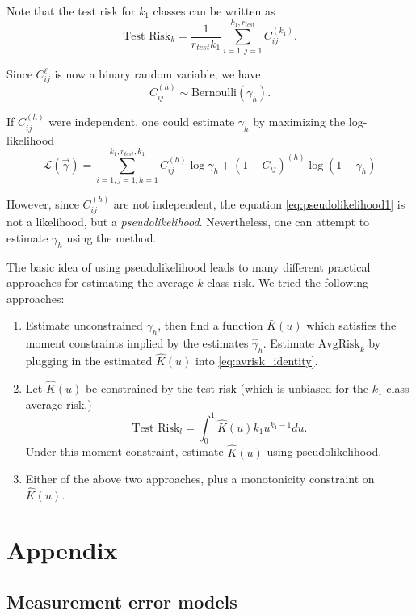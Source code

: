 \documentclass[12pt]{article}
\begin{document}
Note that the test risk for $k_1$ classes can be written as
\[
\text{Test Risk}_k = \frac{1}{r_{test}k_1}\sum_{i=1,j=1}^{k_1,r_{test}} C_{ij}^{(k_1)}.
\]

Since $C_{ij}^\ell$ is now a binary random variable, we have
\[
C_{ij}^{(h)} \sim \text{Bernoulli}(\gamma_h).
\]

If $C_{ij}^{(h)}$ were independent, one could estimate $\gamma_h$ by
maximizing the log-likelihood
\begin{equation}\label{eq:pseudolikelihood1}
\mathcal{L}(\vec{\gamma}) = \sum_{i=1,j=1,h=1}^{k_1, r_{test}, k_1} C_{ij}^{(h)} \log \gamma_h + (1-C_{ij})^{(h)} \log (1-\gamma_h)
\end{equation}

However, since $C_{ij}^{(h)}$ are not independent, the equation
\eqref{eq:pseudolikelihood1} is not a likelihood, but a
\emph{pseudolikelihood}.  Nevertheless, one can attempt to estimate
$\gamma_h$ using the method.

The basic idea of using pseudolikelihood leads to many different
practical approaches for estimating the average $k$-class risk.  We tried the following approaches:
\begin{enumerate}
\item Estimate unconstrained $\gamma_h$, then find a function
  $\bar{K}(u)$ which satisfies the moment constraints implied by the
  estimates $\hat{\gamma}_h$.  Estimate $\text{AvgRisk}_k$ by plugging
  in the estimated $\hat{K}(u)$ into \eqref{eq:avrisk_identity}.
\item Let $\hat{K}(u)$ be constrained by the test risk (which is unbiased for the $k_1$-class average risk,)
\[
\text{Test Risk}_l = \int_0^1 \hat{K}(u) k_1 u^{k_1 -1} du.
\]
Under this moment constraint, estimate $\hat{K}(u)$ using pseudolikelihood.
\item Either of the above two approaches, plus a monotonicity constraint on $\hat{K}(u).$
\end{enumerate}







\appendix
\section{Appendix}
\subsection{Measurement error models}\label{sec:me}
\end{document}
